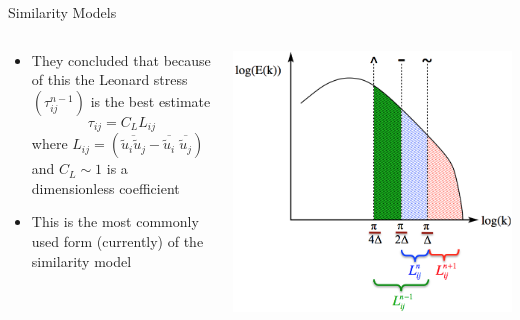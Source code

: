 
\begin{frame}{Similarity Models}
\begin{columns}[T]
    \begin{column}{.55\textwidth}
    \begin{minipage}[c][.6\textheight][c]{\linewidth}
    \begin{itemize}
	\item They concluded that because of this the Leonard stress $(\tau_{ij}^{n-1})$ is the best estimate
	$$\boxed{\tau_{ij} = C_L L_{ij}}$$
	where $L_{ij} = \left(\overline{\widetilde{u}_i\widetilde{u}_j} - \overline{\widetilde{u}_i}\; \overline{\widetilde{u}_j}\right)$ and $C_L\sim 1$ is a dimensionless coefficient
	\item This is the most commonly used form (currently) of the similarity model
\end{itemize}
      \end{minipage}
    \end{column}
    \begin{column}{.55\textwidth}
      \includegraphics[width=\textwidth]{scalesimilarity}
    \end{column}
  \end{columns}
 \end{frame}
  

